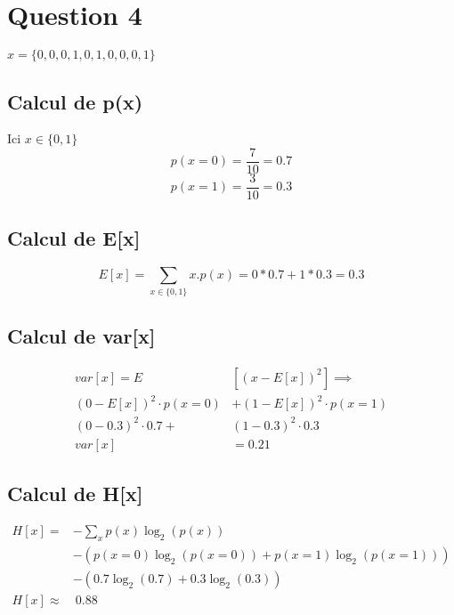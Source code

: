 \section{Question 4}
$x=\{0, 0, 0, 1, 0, 1, 0, 0, 0, 1\}$
\subsection{Calcul de p(x)}
Ici $ x \in \{0, 1\}$
$$p(x=0) = \frac{7}{10} = 0.7$$
$$p(x=1) = \frac{3}{10} = 0.3$$
\subsection{Calcul de E[x]}
$$E[x] = \sum_{x \in \{0, 1\}} x.p(x) = 0*0.7 + 1*0.3 = 0.3$$

\subsection{Calcul de var[x]}
\begin{equation*}
    \begin{split}
        var[x] = E&[(x-E[x])^2] \implies\\
        (0 - E[x])^2 \cdot p(x=0)& + (1 - E[x])^2 \cdot p(x=1) \\
        (0 - 0.3)^2 \cdot 0.7 + &(1 - 0.3)^2 \cdot 0.3 \\
        var[x] &= 0.21
    \end{split}
\end{equation*}

\subsection{Calcul de H[x]}
\begin{equation*}
    \begin{split}
        H[x] = &-\sum_x p(x) \log_2(p(x)) \\
        &-( p(x=0)\log_2(p(x=0)) + p(x=1)\log_2(p(x=1)) ) \\
        &-( 0.7\log_2(0.7) + 0.3\log_2(0.3) ) \\
        H[x] \approx&\> 0.88
    \end{split}
\end{equation*}
